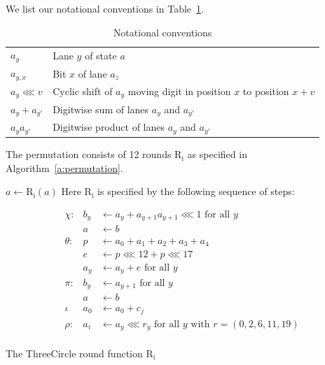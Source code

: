 \documentclass{report}
\newcommand{\round}[1]{\mathrm{R_{#1}}}
\newcommand{\shift}[2]{{#1 \lll #2}}
\newcommand{\ThreeCircle}{{\sc ThreeCircle} }
\begin{document}
\noindent
We list our notational conventions in Table~\ref{t:conventions}.

\begin{table}
\caption{\label{t:conventions}Notational conventions}
\begin{center}
\begin{tabular}{ll}\hline
$a_y$               & Lane $y$ of state $a$ \\
$a_{y,x}$           & Bit $x$ of lane $a_z$ \\
$\shift{a_y}{v}$    & Cyclic shift of $a_y$ moving digit in position $x$ to position $x+v$\\
$a_y + a_{y'}$      & Digitwise sum of lanes $a_y$ and $a_{y'}$ \\
$a_y a_{y'}$        & Digitwise product of lanes $a_y$ and $a_{y'}$ \\
\hline
\end{tabular}
\end{center}
\end{table}

The permutation consists of 12 rounds $\round{i}$ as specified in Algorithm~\ref{a:permutation}. 

\begin{algorithm}
\begin{algorithmic}
    \STATE $a \gets \round{i}(a)$
\ENDFOR
\STATE Here $\round{i}$ is specified by the following sequence of steps: 
\end{algorithmic}
\begin{displaymath}
\begin{array}{lll}
\chi:    & b_y & \gets a_y + \shift{a_{y+1}a_{y+1}}{1} \text{ for all } y \\
         & a   & \gets b\\
\theta:  & p   & \gets a_0 + a_1 + a_2 + a_3 + a_4\\ 
         & e   & \gets \shift{p}{12} + \shift{p}{17}\\
         & a_y & \gets a_y + e \text{ for all } y\\
\pi:     & b_y & \gets a_{y+1} \text{ for all } y\\
         & a   & \gets b\\
\iota    & a_0 & \gets a_0 + c_j \\
\rho:    & a_i & \gets \shift{a_y}{r_y} \text{ for all } y \text{ with } r = (0,2,6,11,19)\\
\end{array}
\end{displaymath}
\caption{\label{a:permutation} The \ThreeCircle round function $\round{i}$}
\end{algorithm}
\end{document}
